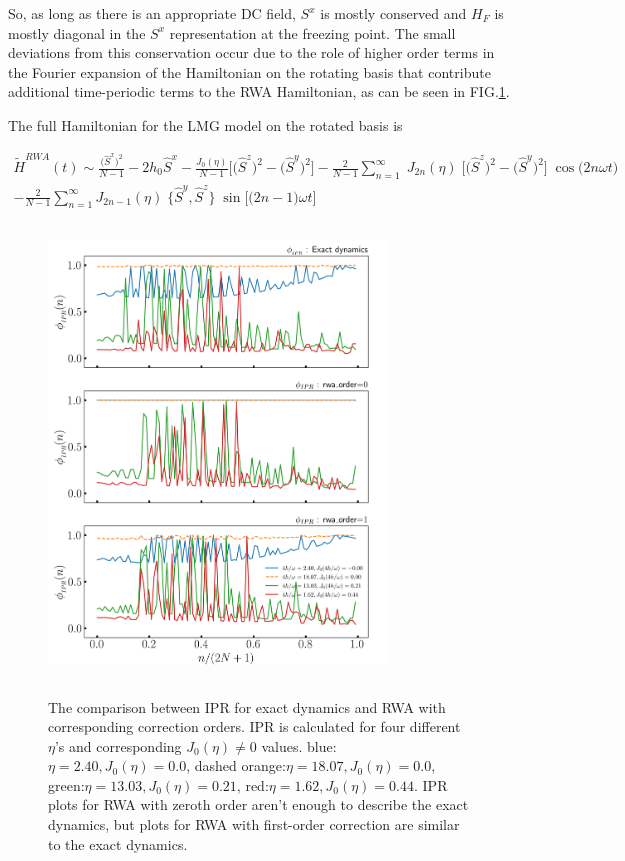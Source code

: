 \documentclass[%
reprint,
superscriptaddress,
amsmath,amssymb,
aps,
prb,
]{revtex4-2}
\begin{document}
	So, as long as there is an appropriate DC field, $S^x$ is mostly conserved and $H_F$ is mostly diagonal in the $S^x$ representation at the freezing point. The small deviations from this conservation occur due to the role of higher order terms in the Fourier expansion of the Hamiltonian on the rotating basis that contribute additional time-periodic terms to the RWA Hamiltonian, as can be seen in FIG.\ref{lmg_ipr_rwa11}.
	
	The full Hamiltonian for the LMG model on the rotated basis is
	\begin{widetext}
		\begin{multline}
			\tilde{H}^{RWA}(t)\sim \frac{\big(\hat{S}^x\big)^{2}}{N-1} - 2h_0 \hat{S}^x - \frac{J_0(\eta)}{N-1}\bigg[\big(\hat{S}^z\big)^{2} - \big(\hat{S}^y\big)^{2} \bigg] - \frac{2}{N-1}\sum^\infty_{n=1}\;J_{2n}(\eta)\;\Big[\big( \hat{S}^z\big)^2 - \big( \hat{S}^y\big)^2\Big]\;\cos{\big(2n\omega t\big)}\\
			- \frac{2}{N-1}\sum^\infty_{n=1}J_{2n-1}(\eta)\;\big\{ \hat{S}^y,  \hat{S}^z \big\}  \;\sin{\Big[\big(2n-1\big)\omega t\Big]}
		\end{multline}
	\end{widetext}
	
	\begin{figure}[ht!]
		\centering
		\includegraphics[height = 12.0cm, width =9.0cm]{comprasion_LMG_50_highFr90_exact_nd_rwa.jpeg}
		\label{lmg_ipr_rwa11}
		\caption{The comparison between IPR for exact dynamics and RWA with corresponding correction orders. IPR is calculated for four different $\eta$'s and corresponding $J_0(\eta)\neq 0$ values. blue:$\eta = 2.40, J_0(\eta) = 0.0$, dashed orange:$\eta = 18.07, J_0(\eta) = 0.0$, green:$\eta =13.03, J_0(\eta) = 0.21$, red:$\eta = 1.62, J_0(\eta)= 0.44$. IPR plots for RWA with zeroth order aren't enough to describe the exact dynamics, but plots for RWA with first-order correction are similar to the exact dynamics.}
	\end{figure}
	
\end{document}
